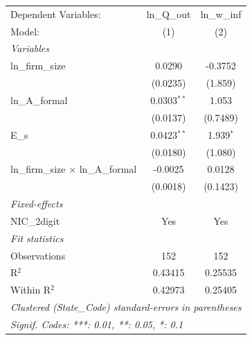 
\begingroup
\centering
\begin{tabular}{lcc}
   \tabularnewline \midrule \midrule
   Dependent Variables:                       & ln\_Q\_out    & ln\_w\_inf\\    
   Model:                                     & (1)           & (2)\\  
   \midrule
   \emph{Variables}\\
   ln\_firm\_size                             & 0.0290        & -0.3752\\   
                                              & (0.0235)      & (1.859)\\   
   ln\_A\_formal                              & 0.0303$^{**}$ & 1.053\\   
                                              & (0.0137)      & (0.7489)\\   
   E\_s                                       & 0.0423$^{**}$ & 1.939$^{*}$\\   
                                              & (0.0180)      & (1.080)\\   
   ln\_firm\_size $\times$ ln\_A\_formal      & -0.0025       & 0.0128\\   
                                              & (0.0018)      & (0.1423)\\   
   \midrule
   \emph{Fixed-effects}\\
   NIC\_2digit                                & Yes           & Yes\\  
   \midrule
   \emph{Fit statistics}\\
   Observations                               & 152           & 152\\  
   R$^2$                                      & 0.43415       & 0.25535\\  
   Within R$^2$                               & 0.42973       & 0.25405\\  
   \midrule \midrule
   \multicolumn{3}{l}{\emph{Clustered (State\_Code) standard-errors in parentheses}}\\
   \multicolumn{3}{l}{\emph{Signif. Codes: ***: 0.01, **: 0.05, *: 0.1}}\\
\end{tabular}
\par\endgroup


